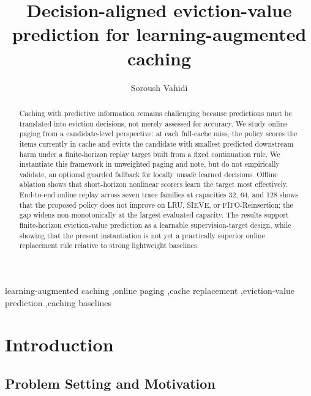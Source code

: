 \documentclass[preprint,12pt]{elsarticle}
\begin{document}
\begin{frontmatter}

\title{Decision-aligned eviction-value prediction for learning-augmented caching}

\author[label1]{Soroush Vahidi}


\begin{abstract}
Caching with predictive information remains challenging because predictions must be translated into eviction decisions, not merely assessed for accuracy. We study online paging from a candidate-level perspective: at each full-cache miss, the policy scores the items currently in cache and evicts the candidate with smallest predicted downstream harm under a finite-horizon replay target built from a fixed continuation rule. We instantiate this framework in unweighted paging and note, but do not empirically validate, an optional guarded fallback for locally unsafe learned decisions. Offline ablation shows that short-horizon nonlinear scorers learn the target most effectively. End-to-end online replay across seven trace families at capacities 32, 64, and 128 shows that the proposed policy does not improve on LRU, SIEVE, or FIFO-Reinsertion; the gap widens non-monotonically at the largest evaluated capacity. The results support finite-horizon eviction-value prediction as a learnable supervision-target design, while showing that the present instantiation is not yet a practically superior online replacement rule relative to strong lightweight baselines.
\end{abstract}

\begin{keyword}
learning-augmented caching \sep online paging \sep cache replacement \sep eviction-value prediction \sep caching baselines
\end{keyword}
\end{frontmatter}

\section{Introduction}
\label{sec:introduction}

\subsection{Problem Setting and Motivation}
\label{subsec:problem_motivation}
\end{document}
